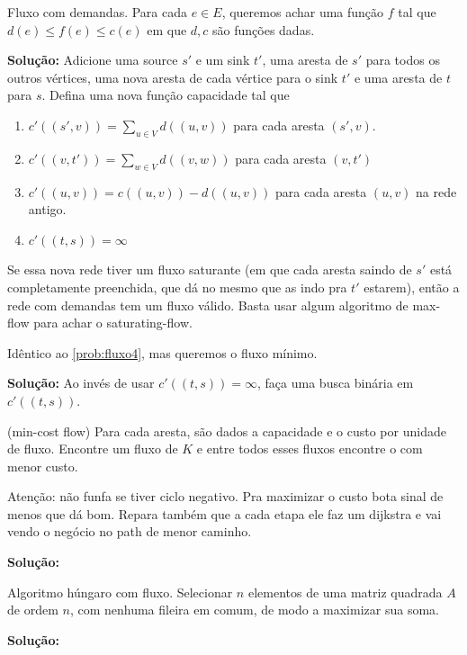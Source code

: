  Fluxo com demandas. Para cada $e \in E$, queremos achar uma função $f$ tal que 
$d(e) \leq f(e) \leq c(e)$ em que $d, c$ são funções dadas.

\textbf{Solução:} Adicione uma source $s'$ e um sink $t'$, uma aresta de $s'$ para todos os outros vértices, uma nova aresta de cada vértice para o sink $t'$ e uma aresta de $t$ para $s$. Defina uma nova função capacidade tal que

\begin{enumerate}
    \item $c'((s', v)) = \sum_{u \in V} d((u, v))$ para cada aresta $(s', v)$.
    \item $c'((v, t')) = \sum_{w \in V} d((v, w))$ para cada aresta $(v, t')$
    \item $c'((u, v)) = c((u, v)) - d((u, v))$ para cada aresta $(u, v)$ na rede antigo.
    \item $c'((t, s)) = \infty$
\end{enumerate}

Se essa nova rede tiver um fluxo saturante (em que cada aresta saindo de $s'$ está completamente preenchida, que dá no mesmo que as indo pra $t'$ estarem), então a rede com demandas tem um fluxo válido. Basta usar algum algoritmo de max-flow para achar o saturating-flow. 

 Idêntico ao \ref{prob:fluxo4}, mas queremos o fluxo mínimo.

\textbf{Solução:} Ao invés de usar $c'((t, s)) = \infty$, faça uma busca binária em $c'((t, s))$.

 (min-cost flow) Para cada aresta, são dados a capacidade e o custo por unidade de fluxo.
Encontre um fluxo de $K$ e entre todos esses fluxos encontre o com menor custo.

Atenção: não funfa se tiver ciclo negativo. Pra maximizar o custo bota sinal de menos que dá bom.
Repara também que a cada etapa ele faz um dijkstra e vai vendo o negócio no path de menor caminho.

\textbf{Solução:}


 Algoritmo húngaro com fluxo. Selecionar $n$ elementos de uma matriz quadrada $A$ de ordem $n$, com nenhuma fileira em comum, de modo a maximizar sua soma.

\textbf{Solução:}

